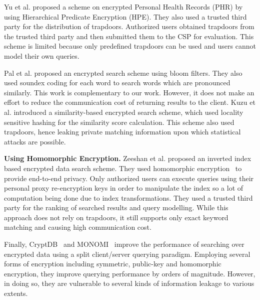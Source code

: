 Yu et al. \cite{li} proposed a scheme on encrypted Personal Health Records
(PHR) by using Hierarchical Predicate Encryption (HPE). They also used a 
trusted third party for the distribution of trapdoors. 
Authorized users obtained trapdoors from the trusted third party and then 
submitted them to the CSP for evaluation. This scheme is limited because only 
predefined trapdoors can be used and users cannot model their own queries.

Pal et al. \cite{saibal} proposed an encrypted search scheme using bloom filters. They
also used soundex coding\cite{odell1918soundex} for each word to search words
which are pronounced similarly. This work is complementary to our work. However, it
does not make an effort to reduce the communication cost of returning results to the
client. Kuzu et al.\cite{mehmat} introduced a similarity-based encrypted search scheme,
which used locality sensitive hashing for the similarity score calculation.
This scheme also used trapdoors, hence leaking private matching information
upon which statistical attacks are possible. 


\textbf{Using Homomorphic Encryption.}
Zeeshan et al.\cite{zeehan} proposed an inverted index based encrypted data search scheme.
They used homomorphic encryption~\cite{craig} to provide end-to-end privacy. Only
authorized users can execute queries using their personal proxy re-encryption keys in
order to manipulate the index so a lot of computation being done due to index
transformations. They used a trusted third party for the ranking of searched results and query modelling. While this approach does not rely on trapdoors, it still supports only
exact keyword matching and causing high communication cost.

Finally, CryptDB~\cite{popa2011cryptdb} and MONOMI~\cite{tu2013processing} improve the performance of searching over encrypted data using
a split client/server querying paradigm. Employing several forms of encryption including
symmetric, public-key and homomorphic encryption, they improve querying performance by orders
of magnitude. However, in doing so, they are vulnerable to several kinds of information leakage to various extents.
